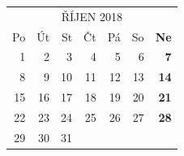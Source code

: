 \documentclass{article}
\begin{document}
\newpage
\begin{table}[t!]
\centering
{}
\end{table}

\selectfont
\def\arraystretch{1.75}
\tabcolsep=10pt
\begin{tabular}{*6{r}>{\bfseries}r}
\multicolumn{7}{c}{ŘÍJEN 2018}\\
\rowcolor[gray]{.75} Po & Út & St & Čt & Pá & So & Ne \\
\hline
                     1  & 2  & 3  & 4  & 5  & 6  & 7  \\
                     8  & 9  & 10 & 11 & 12 & 13 & 14 \\
                     15 & 16 & 17 & 18 & 19 & 20 & 21 \\
                     22 & 23 & 24 & 25 & 26 & 27 & 28 \\
                     29 & 30 & 31 &    &    &    &    \\
\end{tabular}

\newpage
\begin{table}[t!]
\centering
{}
\end{table}
\end{document}
